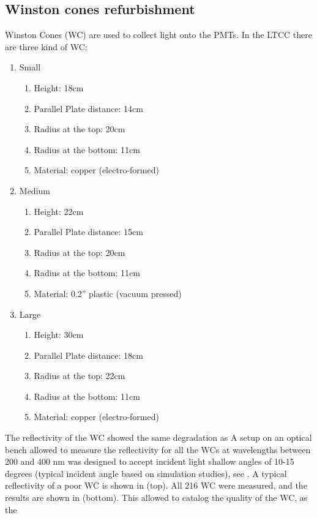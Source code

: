 \subsection{Winston cones refurbishment}

Winston Cones (WC) are used to collect light onto the PMTs. In the LTCC there are three kind of WC:

\begin{enumerate}

\item Small
	\begin{enumerate}
		\item Height: 18cm
		\item Parallel Plate distance: 14cm
		\item Radius at the top: 20cm
		\item Radius at the bottom: 11cm
		\item Material: copper (electro-formed)
	\end{enumerate}

	\item Medium
	\begin{enumerate}
		\item Height: 22cm
		\item Parallel Plate distance: 15cm
		\item Radius at the top: 20cm
		\item Radius at the bottom: 11cm
		\item Material: 0.2” plastic (vacuum pressed)
	\end{enumerate}

	\item Large
	\begin{enumerate}
		\item Height: 30cm
		\item Parallel Plate distance: 18cm
		\item Radius at the top: 22cm
		\item Radius at the bottom: 11cm
		\item Material: copper (electro-formed)
	\end{enumerate}
\end{enumerate}

The reflectivity of the WC showed the same degradation as 
A setup on an optical bench allowed to measure the reflectivity for all the WCs at wavelengths between 200 and 400 nm was designed to accept incident light
shallow angles of 10-15 degrees (typical incident angle based on simulation studies), see . A typical reflectivity of a poor WC is shown in  (top).
All 216 WC were measured, and the results are shown in  (bottom). This allowed to catalog the quality of the WC, as the

